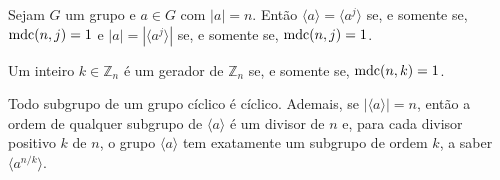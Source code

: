 %
\begin{corollary}
\label{cor-geradores-ciclicos}
    Sejam $G$ um grupo e $a\in G$ com $|a|=n$. Então $\langle a \rangle = \langle a^j \rangle$ se,
    e somente se, $\operatorname{mdc}(n,j) = 1$ e $|a| = |\langle a^j \rangle|$ se, e somente se, $\operatorname{mdc}(n,j) = 1$.
\end{corollary}
%
\begin{corollary}
\label{cor-geradores-Zn}
    Um inteiro $k\in \mathbb{Z}_n$ é um gerador de $\mathbb{Z}_n$ se, e somente se, $\operatorname{mdc}(n,k) = 1$.
\end{corollary}
%
\begin{theorem}
\label{teo-fund-grupos-ciclicos}
    Todo subgrupo de um grupo cíclico é cíclico. Ademais, se $|\langle a \rangle| = n$, então
    a ordem de qualquer subgrupo de $\langle a \rangle$ é um divisor de $n$ e, para cada divisor
    positivo $k$ de $n$, o grupo $\langle a \rangle$ tem exatamente um subgrupo de ordem $k$, a saber
    $\langle a^{n/k} \rangle$.
\end{theorem}
%

